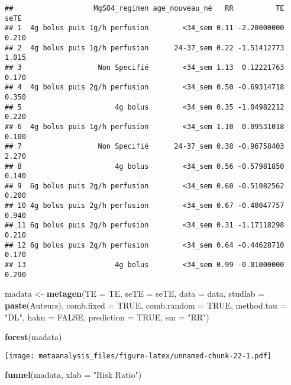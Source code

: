 \documentclass[
]{article}
\newenvironment{Shaded}{\begin{snugshade}}{\end{snugshade}}
\newcommand{\AttributeTok}[1]{\textcolor[rgb]{0.13,0.29,0.53}{#1}}
\newcommand{\ConstantTok}[1]{\textcolor[rgb]{0.56,0.35,0.01}{#1}}
\newcommand{\FunctionTok}[1]{\textcolor[rgb]{0.13,0.29,0.53}{\textbf{#1}}}
\newcommand{\NormalTok}[1]{#1}
\newcommand{\OtherTok}[1]{\textcolor[rgb]{0.56,0.35,0.01}{#1}}
\newcommand{\StringTok}[1]{\textcolor[rgb]{0.31,0.60,0.02}{#1}}
\begin{document}
\begin{verbatim}
##                   MgSO4_regimen age_nouveau_né   RR          TE  seTE
## 1  4g bolus puis 1g/h perfusion        <34_sem 0.11 -2.20000000 0.210
## 2  4g bolus puis 1g/h perfusion      24-37_sem 0.22 -1.51412773 1.015
## 3                  Non Specifié        <34_sem 1.13  0.12221763 0.170
## 4  4g bolus puis 2g/h perfusion        <34_sem 0.50 -0.69314718 0.350
## 5                      4g bolus        <34_sem 0.35 -1.04982212 0.220
## 6  4g bolus puis 1g/h perfusion        <34_sem 1.10  0.09531018 0.100
## 7                  Non Specifié      24-37_sem 0.38 -0.96758403 2.270
## 8                      4g bolus        <34_sem 0.56 -0.57981850 0.140
## 9  6g bolus puis 2g/h perfusion        <34_sem 0.60 -0.51082562 0.200
## 10 4g bolus puis 2g/h perfusion        <34_sem 0.67 -0.40047757 0.940
## 11 6g bolus puis 2g/h perfusion        <34_sem 0.31 -1.17118298 0.210
## 12 6g bolus puis 2g/h perfusion        <34_sem 0.64 -0.44628710 0.170
## 13                     4g bolus        <34_sem 0.99 -0.01000000 0.290
\end{verbatim}

\begin{Shaded}
\begin{Highlighting}[]
\NormalTok{madata }\OtherTok{\textless{}{-}} \FunctionTok{metagen}\NormalTok{(}\AttributeTok{TE =}\NormalTok{ TE,}
            \AttributeTok{seTE =}\NormalTok{ seTE,}
            \AttributeTok{data =}\NormalTok{ data,}
            \AttributeTok{studlab =} \FunctionTok{paste}\NormalTok{(Auteurs),}
            \AttributeTok{comb.fixed =} \ConstantTok{TRUE}\NormalTok{,}
            \AttributeTok{comb.random =} \ConstantTok{TRUE}\NormalTok{,}
            \AttributeTok{method.tau =} \StringTok{"DL"}\NormalTok{,}
            \AttributeTok{hakn =} \ConstantTok{FALSE}\NormalTok{,}
            \AttributeTok{prediction =} \ConstantTok{TRUE}\NormalTok{,}
            \AttributeTok{sm =} \StringTok{"RR"}\NormalTok{)}
\end{Highlighting}
\end{Shaded}

\begin{Shaded}
\begin{Highlighting}[]
\FunctionTok{forest}\NormalTok{(madata)}
\end{Highlighting}
\end{Shaded}

\texttt{[image: metaanalysis\_files/figure-latex/unnamed-chunk-22-1.pdf]}

\begin{Shaded}
\begin{Highlighting}[]
\FunctionTok{funnel}\NormalTok{(madata, }\AttributeTok{xlab =} \StringTok{"Risk Ratio"}\NormalTok{)}
\end{Highlighting}
\end{Shaded}
\end{document}
